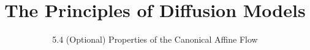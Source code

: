 ﻿%

\graphicspath{{../images/}}
\title{The Principles of Diffusion Models}
\subtitle{5.4 (Optional) Properties of the Canonical Affine Flow}


\begin{frame}
    \titlepage
\end{frame}


